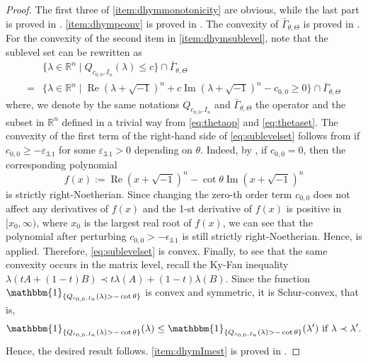 \documentclass{amsart}
\numberwithin{equation}{section}
\theoremstyle{plain}
\theoremstyle{definition}
\theoremstyle{remark}
\begin{document}
\begin{proof}
    The first three of \ref{item:dhymmonotonicity} are obvious, while the last part is proved in \cite[Lemma 5.6 (3)]{GChen}. \ref{item:dhympconv} is proved in \cite[Proposition 2.2]{CLT}. The convexity of $\bar{\Gamma}_{\theta,\Theta}$ is proved in \cite[Lemma 5.6 (10)]{GChen}. For the convexity of the second item in \ref{item:dhymsublevel}, 
    note that the sublevel set can be rewritten as
    \begin{equation}\label{eq:sublevelset}
        \begin{aligned}
            &\{\lambda\in\mathbb{R}^n\mid Q_{c_{0,0},I_n}(\lambda)\le c\}\cap\bar{\Gamma}_{\theta,\Theta}\\
        =&\{\lambda\in\mathbb{R}^n\mid \operatorname{Re}(\lambda+\sqrt{-1})^n+c\operatorname{Im}(\lambda+\sqrt{-1})^n-c_{0,0}\ge0\}\cap\bar{\Gamma}_{\theta,\Theta}
        \end{aligned}
    \end{equation}
    where, we denote by the same notations $Q_{c_{0,0},I_n}$ and $\bar{\Gamma}_{\theta,\Theta}$ the operator and the subset in $\mathbb{R}^n$ defined in a trivial way from \eqref{eq:thetaop} and \eqref{eq:thetaset}. The convexity of the first term of the right-hand side of \eqref{eq:sublevelset} follows from \cite[Theorem 1.1]{Lina} if $c_{0,0}\ge-\varepsilon_{3.1}$ for some $\varepsilon_{3.1}>0$ depending on $\theta$. Indeed, by \cite[Lemma 4.2]{Lina}, if $c_{0,0}=0$, then the corresponding polynomial
    $$f(x):=\operatorname{Re}(x+\sqrt{-1})^n-\cot\theta\operatorname{Im}(x+\sqrt{-1})^n$$
    is strictly right-Noetherian. Since changing the zero-th order term $c_{0,0}$ does not affect any derivatives of $f(x)$ and the 1-st derivative of $f(x)$ is positive in $[x_0,\infty)$, where $x_0$ is the largest real root of $f(x)$, we can see that the polynomial after perturbing $c_{0,0}>-\epsilon_{3.1}$ is still strictly right-Noetherian. Hence, \cite[Theorem 1.1]{Lina} is applied. Therefore, \eqref{eq:sublevelset} is convex.
    Finally, to see that the same convexity occurs in the matrix level, recall the Ky-Fan inequality 
    $\lambda(tA+(1-t)B)\prec t\lambda(A)+(1-t)\lambda(B)$.
    Since the function $\mathbbm{1}_{\{Q_{c_{0,0},I_n}(\lambda)>-\cot\theta\}}$ is convex and symmetric, it is Schur-convex, that is, 
    $$\mathbbm{1}_{\{Q_{c_{0,0},I_n}(\lambda)>-\cot\theta\}}(\lambda)\le\mathbbm{1}_{\{Q_{c_{0,0},I_n}(\lambda)>-\cot\theta\}}(\lambda') \text{ if }\lambda\prec\lambda'.$$
    Hence, the desired result follows. 
    \ref{item:dhymImest} is proved in \cite[Lemma 5.6 (1)]{GChen}.
\end{proof}
\end{document}
